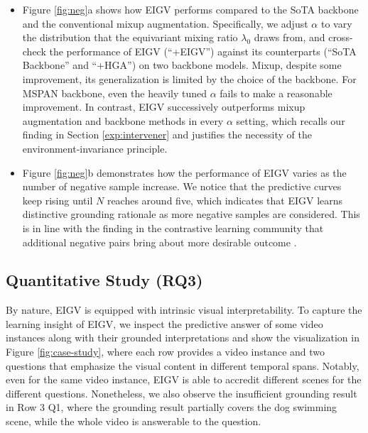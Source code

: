 \begin{itemize}[leftmargin=*]
\item Figure \ref{fig:neg}a shows how EIGV performs compared to the SoTA backbone and the conventional mixup augmentation. Specifically, we adjust $\alpha$ to vary the distribution that the equivariant mixing ratio $\lambda_0$ draws from, and cross-check the performance of EIGV (``+EIGV'') against its counterparts (``SoTA Backbone'' and ``+HGA'') on two backbone models. Mixup, despite some improvement, its generalization is limited by the choice of the backbone. For MSPAN backbone, even the heavily tuned $\alpha$ fails to make a reasonable improvement. In contrast, EIGV successively outperforms mixup augmentation and backbone methods in every $\alpha$ setting, which recalls our finding in Section \ref{exp:intervener} and justifies the necessity of the environment-invariance principle.      

\item Figure \ref{fig:neg}b demonstrates how the performance of EIGV varies as the number of negative sample increase. We notice that the predictive curves keep rising until $N$ reaches around five, which indicates that EIGV learns distinctive grounding rationale as more negative samples are considered. This is in line with the finding in the contrastive learning community that additional negative pairs bring about more desirable outcome \cite{he2019moco}. 
\end{itemize}



\subsection{Quantitative Study (RQ3)}
By nature, EIGV is equipped with intrinsic visual interpretability. To capture the learning insight of EIGV, we inspect the predictive answer of some video instances along with their grounded interpretations and show the visualization in Figure \ref{fig:case-study}, where each row provides a video instance and two questions that emphasize the visual content in different temporal spans. Notably, even for the same video instance, EIGV is able to accredit different scenes for the different questions. Nonetheless, we also observe the insufficient grounding result in Row 3 Q1, where the grounding result partially covers the dog swimming scene, while the whole video is answerable to the question.


